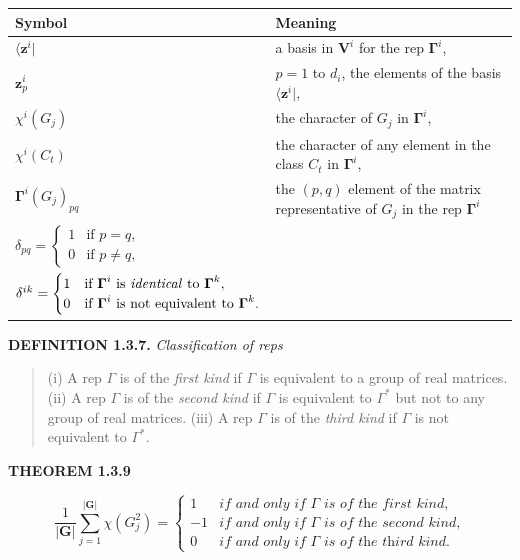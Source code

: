 \documentclass[11pt,a4paper,twoside,openright]{book}
\begin{document}
\begin{tabular}{|p{}|p{}|}
\hline
Symbol & Meaning \\ \hline
$\langle \mathbf{z}^{i}|$ & a basis in $\mathbf{V}^{i}$ for the rep $\boldsymbol{\Gamma}^{i}$, \\ \hline
$\mathbf{z}_{p}^{i}$ & $p = 1$ to $d_{i}$, the elements of the basis $\langle \mathbf{z}^{i}|$, \\ \hline
$\chi^{i}(G_{j})$ & the character of $G_{j}$ in $\boldsymbol{\Gamma}^{i}$, \\ \hline
$\chi^{i}(C_{t})$ & the character of any element in the class $C_{t}$ in $\boldsymbol{\Gamma}^{i}$, \\ \hline
$\boldsymbol{\Gamma}^{i}(G_{j})_{pq}$ & the $(p, q)$ element of the matrix representative of $G_{j}$ in the rep $\boldsymbol{\Gamma}^{i}$ \\ \hline
$\delta_{pq} = \begin{cases}1 & \text{if } p = q, \\ 0 & \text{if } p \neq q,\end{cases}$ &  \\ \hline
$\delta^{ik} = \begin{cases}1 & \text{if } \boldsymbol{\Gamma}^{i} \text{ is \textit{identical} to } \boldsymbol{\Gamma}^{k}, \\ 0 & \text{if } \boldsymbol{\Gamma}^{i} \text{ is not equivalent to } \boldsymbol{\Gamma}^{k}.\end{cases}$ &  \\ \hline
\end{tabular}
\medskip

\textbf{DEFINITION 1.3.7.} \textit{Classification of reps}

\begin{quote}(i) A rep $\Gamma$ is of the \textit{first kind} if $\Gamma$ is equivalent to a group of real matrices. (ii) A rep $\Gamma$ is of the \textit{second kind} if $\Gamma$ is equivalent to $\Gamma^{*}$ but not to any group of real matrices. (iii) A rep $\Gamma$ is of the \textit{third kind} if $\Gamma$ is not equivalent to $\Gamma^{*}$.\end{quote}

\textbf{THEOREM 1.3.9}

\begin{equation*}
\frac{1}{|\mathbf{G}|}\sum_{j=1}^{|\mathbf{G}|} \chi(G_{j}^{2}) = \begin{cases} 1 & \textit{if and only if } \Gamma \textit{ is of the first kind,} \\ -1 & \textit{if and only if } \Gamma \textit{ is of the second kind,} \\ 0 & \textit{if and only if } \Gamma \textit{ is of the third kind.} \end{cases} \tag{1.3.12}
\end{equation*}
\end{document}
